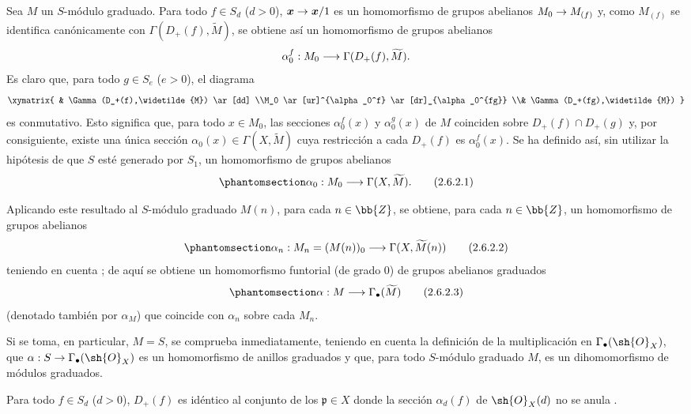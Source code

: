 \documentclass[oneside,10pt]{amsart}
\makeatletter
\newcommand{\ega@arrow}[2]{\mathchoice{#1}{#2}{#2}{#2}}
\renewcommand{\to}{\ega@arrow{\longrightarrow}{\rightarrow}}
\newcommand{\oldpage}[2][]{\marginnote{\normalfont\footnotesize\textbf{#1}~|~#2}\ignorespaces}
\let\EGAOriginalLabel\label
\renewcommand{\label}[1]{\phantomsection\EGAOriginalLabel{#1}}
\makeatother
\begin{document}
\begin{env}[2.6.2]
\label{II.2.6.2}
Sea $M$ un $S$-módulo graduado.
Para todo $f\in S_d$ ($d>0$), $\boldsymbol{x}\to\boldsymbol{x}/1$ es un homomorfismo de grupos abelianos $M_0\to M_{(f)}$ y, como $M_{(f)}$ se identifica canónicamente
\oldpage[II]{37}
con $\Gamma(D_+(f),\widetilde{M})$, se obtiene así un homomorfismo de grupos abelianos
\[
  \alpha_0^f:M_0\to\Gamma(D_+(f),\widetilde{M}).
\]
Es claro que, para todo $g\in S_e$ ($e>0$), el diagrama
\[
  \xymatrix{
    & \Gamma(D_+(f),\widetilde{M}) \ar[dd]
  \\M_0 \ar[ur]^{\alpha_0^f} \ar[dr]_{\alpha_0^{fg}}
  \\& \Gamma(D_+(fg),\widetilde{M})
  }
\]
es conmutativo.
Esto significa que, para todo $x\in M_0$, las secciones $\alpha_0^f(x)$ y $\alpha_0^g(x)$ de $M$ coinciden sobre $D_+(f)\cap D_+(g)$ y, por consiguiente, existe una única sección $\alpha_0(x)\in\Gamma(X,\widetilde{M})$ cuya restricción a cada $D_+(f)$ es $\alpha_0^f(x)$.
Se ha definido así, sin utilizar la hipótesis de que $S$ esté generado por $S_1$, un homomorfismo de grupos abelianos
\[
\label{II.2.6.2.1}
  \alpha_0:M_0\to\Gamma(X,\widetilde{M}).
\tag{2.6.2.1}
\]

Aplicando este resultado al $S$-módulo graduado $M(n)$, para cada $n\in\bb{Z}$, se obtiene, para cada $n\in\bb{Z}$, un homomorfismo de grupos abelianos
\[
\label{II.2.6.2.2}
  \alpha_n:M_n=(M(n))_0\to\Gamma(X,\widetilde{M}(n))
\tag{2.6.2.2}
\]
teniendo en cuenta ; de aquí se obtiene un homomorfismo funtorial (de grado $0$) de grupos abelianos graduados
\[
\label{II.2.6.2.3}
  \alpha:M\to\Gamma_\bullet(\widetilde{M})
\tag{2.6.2.3}
\]
(denotado también por $\alpha_M$) que coincide con $\alpha_n$ sobre cada $M_n$.

Si se toma, en particular, $M=S$, se comprueba inmediatamente, teniendo en cuenta la definición  de la multiplicación en $\Gamma_\bullet(\sh{O}_X)$, que $\alpha:S\to\Gamma_\bullet(\sh{O}_X)$ es un homomorfismo de anillos graduados y que, para todo $S$-módulo graduado $M$,  es un dihomomorfismo de módulos graduados.
\end{env}

\begin{proposition}[2.6.3]
\label{II.2.6.3}
Para todo $f\in S_d$ ($d>0$), $D_+(f)$ es idéntico al conjunto de los $\mathfrak{p}\in X$ donde la sección $\alpha_d(f)$ de $\sh{O}_X(d)$ no se anula .
\end{proposition}
\end{document}
